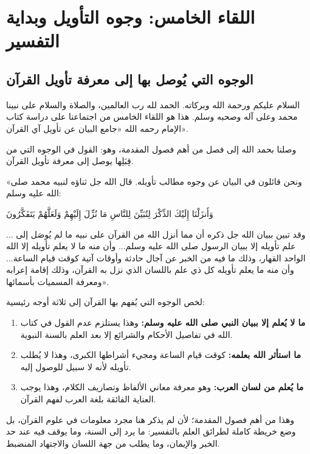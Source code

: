 \chapter{اللقاء الخامس: وجوه التأويل وبداية التفسير}

\section{الوجوه التي يُوصل بها إلى معرفة تأويل القرآن}
السلام عليكم ورحمة الله وبركاته. الحمد لله رب العالمين، والصلاة والسلام على نبينا محمد وعلى آله وصحبه وسلم. هذا هو اللقاء الخامس من اجتماعنا على دراسة كتاب الإمام  رحمه الله «جامع البيان عن تأويل آي القرآن».

وصلنا بحمد الله إلى فصل من أهم فصول المقدمة، وهو: القول في الوجوه التي من قِبَلِها يوصل إلى معرفة تأويل القرآن. 

 «ونحن قائلون في البيان عن وجوه مطالب تأويله. قال الله جل ثناؤه لنبيه محمد صلى الله عليه وسلم: \begin{ayah}وَأَنزَلْنَا إِلَيْكَ الذِّكْرَ لِتُبَيِّنَ لِلنَّاسِ مَا نُزِّلَ إِلَيْهِمْ وَلَعَلَّهُمْ يَتَفَكَّرُونَ\end{ayah}... وقد تبين ببيان الله جل ذكره أن مما أنزل الله من القرآن على نبيه ما لم يُوصَل إلى علم تأويله إلا ببيان الرسول صلى الله عليه وسلم... وأن منه ما لا يعلم تأويله إلا الله الواحد القهار، وذلك ما فيه من الخبر عن آجال حادثة وأوقات آتية كوقت قيام الساعة... وأن منه ما يعلم تأويله كل ذي علم باللسان الذي نزل به القرآن، وذلك إقامة إعرابه ومعرفة المسميات بأسمائها».

\begin{fawaid}
لخص  الوجوه التي يُفهم بها القرآن إلى ثلاثة أوجه رئيسية:
\begin{enumerate}
    \item \textbf{ما لا يُعلم إلا ببيان النبي صلى الله عليه وسلم:} وهذا يستلزم عدم القول في كتاب الله في تفاصيل الأحكام والشرائع إلا بعد العلم بالسنة النبوية.
    \item \textbf{ما استأثر الله بعلمه:} كوقت قيام الساعة ومجيء أشراطها الكبرى، وهذا لا يُطلب تأويله لأنه لا سبيل للوصول إليه.
    \item \textbf{ما يُعلم من لسان العرب:} وهو معرفة معاني الألفاظ وتصاريف الكلام، وهذا يوجب العناية الفائقة بلغة العرب لفهم القرآن.
\end{enumerate}
\end{fawaid}

وهذا من أهم فصول المقدمة؛ لأن  لم يذكر هنا مجرد معلومات في علوم القرآن، بل وضع خريطة كاملة لطرائق العلم بالتفسير: ما يرد إلى السنة، وما يوقف فيه عند حد الخبر والإيمان، وما يطلب من جهة اللسان والاجتهاد المنضبط.

